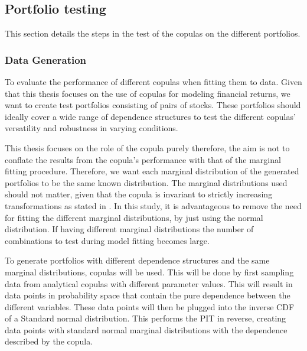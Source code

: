 \subsection{Portfolio testing}\label{sec:PortfolioTesting}
This section details the steps in the test of the copulas on the different portfolios. 

\subsubsection{Data Generation}
To evaluate the performance of different copulas when fitting them to data. Given that this thesis focuses on the use of copulas for modeling financial returns, we want to create test portfolios consisting of pairs of stocks. These portfolios should ideally cover a wide range of dependence structures to test the different copulas' versatility and robustness in varying conditions. 

This thesis focuses on the role of the copula purely therefore, the aim is not to conflate the results from the copula's performance with that of the marginal fitting procedure. Therefore, we want each marginal distribution of the generated portfolios to be the same known distribution. The marginal distributions used should not matter, given that the copula is invariant to strictly increasing transformations as stated in  . In this study, it is advantageous to remove the need for fitting the different marginal distributions, by just using the normal distribution. If having different marginal distributions the number of combinations to test during model fitting becomes large.  

To generate portfolios with different dependence structures and the same marginal distributions, copulas will be used. This will be done by first sampling data from analytical copulas with different parameter values. This will result in data points in probability space that contain the pure dependence between the different variables. These data points will then be plugged into the inverse \gls{CDF} of a Standard normal distribution. This performs the \gls{PIT} in reverse, creating data points with standard normal marginal distributions with the dependence described by the copula. 


